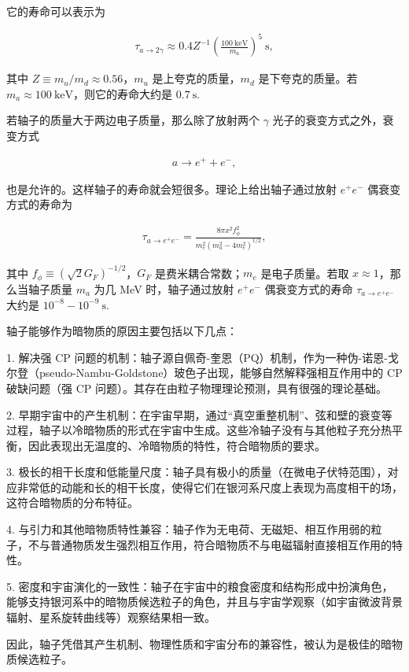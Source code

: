 \documentclass{beamer} %
\begin{document}
\begin{frame}
它的寿命可以表示为

\begin{align}
\tau_{a\to 2\gamma}
\approx 0.4 Z^{-1} \left(\frac{100~\mathrm{keV} }{m_a }  \right)^5~\mathrm{s},
\end{align}

其中 $Z\equiv m_u/m_d \approx 0.56$，$m_u$ 是上夸克的质量，$m_d$ 是下夸克的质量。若 $m_a\approx 100~\mathrm{keV}$，则它的寿命大约是 $0.7~\mathrm{s} .$

若轴子的质量大于两边电子质量，那么除了放射两个 $\gamma$ 光子的衰变方式之外，衰变方式

\begin{align}
a \to e^+ + e^-,
\end{align}

也是允许的。这样轴子的寿命就会短很多。理论上给出轴子通过放射 $e^+ e^-$ 偶衰变方式的寿命为
\end{frame}

\begin{frame}
\begin{align}
\tau_{a\to e^+ e^-}
=\frac{8 \pi x^2 f_\phi^2}{m_e^2\left(m_a^2-4m_e^2 \right)^{1/2} } ,
\end{align}

其中 $f_\phi\equiv \left(\sqrt{2} G_F \right)^{-1/2}$，$G_F$ 是费米耦合常数；$m_e$ 是电子质量。若取 $x\approx 1$，那么当轴子质量 $m_a$ 为几 MeV 时，轴子通过放射 $e^+ e^-$ 偶衰变方式的寿命 $\tau_{a\to e^+ e^-}$ 大约是 $10^{-8} - 10^{-9}~\mathrm{s} .$
\end{frame}

\begin{frame}
轴子能够作为暗物质的原因主要包括以下几点：

1. 解决强 CP 问题的机制：轴子源自佩奇-奎恩（PQ）机制，作为一种伪-诺恩-戈尔登（pseudo-Nambu-Goldstone）玻色子出现，能够自然解释强相互作用中的 CP 破缺问题（强 CP 问题）。其存在由粒子物理理论预测，具有很强的理论基础。

2. 早期宇宙中的产生机制：在宇宙早期，通过“真空重整机制”、弦和壁的衰变等过程，轴子以冷暗物质的形式在宇宙中生成。这些冷轴子没有与其他粒子充分热平衡，因此表现出无温度的、冷暗物质的特性，符合暗物质的要求。

3. 极长的相干长度和低能量尺度：轴子具有极小的质量（在微电子伏特范围），对应非常低的动能和长的相干长度，使得它们在银河系尺度上表现为高度相干的场，这符合暗物质的分布特征。
\end{frame}

\begin{frame}
4. 与引力和其他暗物质特性兼容：轴子作为无电荷、无磁矩、相互作用弱的粒子，不与普通物质发生强烈相互作用，符合暗物质不与电磁辐射直接相互作用的特性。

5. 密度和宇宙演化的一致性：轴子在宇宙中的粮食密度和结构形成中扮演角色，能够支持银河系中的暗物质候选粒子的角色，并且与宇宙学观察（如宇宙微波背景辐射、星系旋转曲线等）观察结果相一致。

因此，轴子凭借其产生机制、物理性质和宇宙分布的兼容性，被认为是极佳的暗物质候选粒子。
\end{frame}
\end{document}
